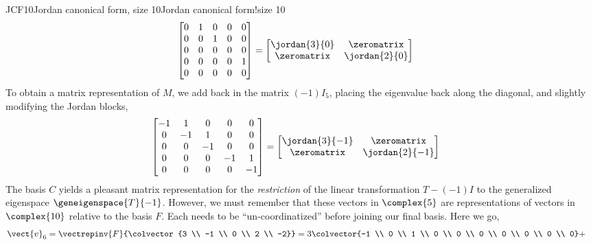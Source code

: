 \begin{example}{JCF10}{Jordan canonical form, size 10}{Jordan canonical form!size 10}
%
\begin{align*}
\begin{bmatrix}
0 & 1 & 0 & 0 & 0 \\
0 & 0 & 1 & 0 & 0 \\
0 & 0 & 0 & 0 & 0 \\
0 & 0 & 0 & 0 & 1 \\
0 & 0 & 0 & 0 & 0 
\end{bmatrix}
&=
\begin{bmatrix}
\jordan{3}{0} & \zeromatrix \\
\zeromatrix & \jordan{2}{0} \\
\end{bmatrix}
%
\end{align*}
%
To obtain a matrix representation of $M$, we add back in the matrix $(-1)I_5$, placing the eigenvalue back along the diagonal, and slightly modifying the Jordan blocks,
%
\begin{align*}
\begin{bmatrix}
-1 & 1 & 0 & 0 & 0 \\
0 & -1 & 1 & 0 & 0 \\
0 & 0 & -1 & 0 & 0 \\
0 & 0 & 0 & -1 & 1 \\
0 & 0 & 0 & 0 & -1 
\end{bmatrix}
&=
\begin{bmatrix}
\jordan{3}{-1} & \zeromatrix \\
\zeromatrix & \jordan{2}{-1} \\
\end{bmatrix}
%
\end{align*}
%
The basis $C$ yields a pleasant matrix representation for the {\em restriction} of the linear transformation $T-(-1)I$ to the generalized eigenspace $\geneigenspace{T}{-1}$.  However, we must remember that these vectors in $\complex{5}$ are representations of vectors in $\complex{10}$ relative to the basis $F$.  Each needs to be ``un-coordinatized'' before joining our final basis.  Here we go,
%
\begin{align*}
\vect{v}_6&=\vectrepinv{F}{\colvector{3 \\ -1 \\ 0 \\ 2 \\ -2}}=
3\colvector{-1 \\ 0 \\ 1 \\ 0 \\ 0 \\ 0 \\ 0 \\ 0 \\ 0 \\ 0}+

\end{align*}
\end{example}
